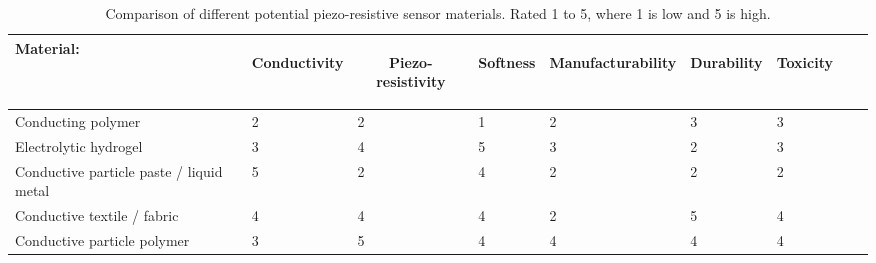 \begin{table}[H]
	\centering
	\caption{Comparison of different potential piezo-resistive sensor materials. Rated 1 to 5, where 1 is low and 5 is high.}
	\label{tab:comparing-piezo-r-materials}
	\vspace{3cm}
	\begin{tabular}{|p{5cm}|p{1cm}|p{1cm}|p{1cm}|p{1cm}|p{1cm}|p{1cm}|p{1cm}|p{1cm}|}
		\multicolumn{1}{l}{\textbf{Material:}} & \multicolumn{1}{c}{\begin{rotate}{60} \hspace{0.1cm}\vspace{-2cm} \textbf{Conductivity} \end{rotate}} & 
		\multicolumn{1}{c}{\begin{rotate}{60} \hspace{0.2cm}\vspace{-2cm} \textbf{Piezo-resistivity} \end{rotate}} & 
		\multicolumn{1}{c}{\begin{rotate}{60} \hspace{0.2cm}\vspace{-2cm} \textbf{Softness} \end{rotate}} & 
		\multicolumn{1}{c}{\begin{rotate}{60} \hspace{0.2cm}\vspace{-2cm} \textbf{Manufacturability} \end{rotate}} & 
		\multicolumn{1}{c}{\begin{rotate}{60} \hspace{0.2cm}\vspace{-2cm} \textbf{Durability} \end{rotate}} & 
		\multicolumn{1}{c}{\begin{rotate}{60} \hspace{0.2cm}\vspace{-2cm} \textbf{Toxicity} \end{rotate}} \\ \hline
		
		Conducting polymer \cite{Guo2018,Hazelton2023,Bhattacharjee2020,Mukherjee2023} & 2 & 2 & 1 & 2 & 3 & 3 \\ \hline
		Electrolytic hydrogel \cite{Guo2018,Shen2022,Li2020a,Li2020b,Lu2014,Wang2018} & 3 & 4 & 5 & 3 & 2 & 3   \\ \hline
		Conductive particle paste / liquid metal \cite{Chen2020a,Park2010,Jung2015} & 5 & 2 & 4 & 2 & 2 & 2 \\ \hline
		Conductive textile / fabric \cite{Jeong2020a,Yao2012,Rashid2022} & 4 & 4 & 4 & 2 & 5 & 4  \\ \hline
		Conductive particle polymer \cite{Princy1998,Spahr2017,Duan2014,Buketov2020} & 3 & 5 & 4 & 4 & 4 & 4 \\ \hline
	\end{tabular}
\end{table}

